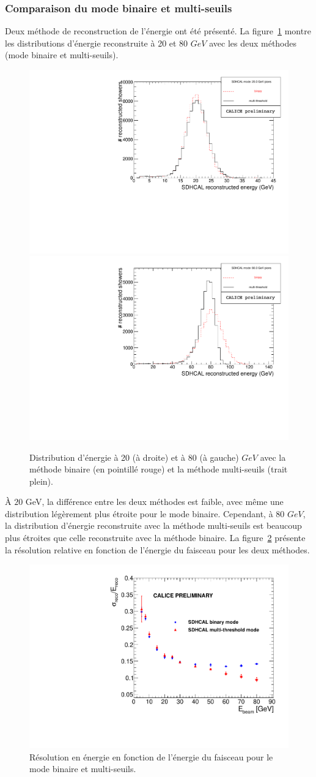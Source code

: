 \subsubsection{Comparaison du mode binaire et multi-seuils}
Deux méthode de reconstruction de l'énergie ont été présenté. La figure~\ref{fig:multi_vs_binary_dist} montre les distributions d'énergie reconstruite à 20 et 80 $GeV$ avec les deux méthodes (mode binaire et multi-seuils).
\begin{figure}[!h]
  \begin{center}
    \includegraphics[width=.45\textwidth]{SDHCAL/figs/Pi20GeV_SDHCAL_2modes_overlay.pdf}
    \includegraphics[width=.45\textwidth]{SDHCAL/figs/Pi80GeV_SDHCAL_2modes_overlay.pdf}
    \caption{Distribution d'énergie à 20 (à droite) et à 80 (à gauche) $GeV$ avec la méthode binaire (en pointillé rouge) et la méthode multi-seuils (trait plein).}
    \label{fig:multi_vs_binary_dist}
  \end{center}
\end{figure}
À $20$ GeV, la différence entre les deux méthodes est faible, avec même une distribution légèrement plus étroite pour le mode binaire. Cependant, à 80 $GeV$, la distribution d'énergie reconstruite avec la méthode multi-seuils est beaucoup plus étroites que celle reconstruite avec la méthode binaire. La figure~\ref{fig:multi_vs_binary_res} présente la résolution relative en fonction de l'énergie du faisceau pour les deux méthodes.
\begin{figure}[!h]
  \begin{center}
    \includegraphics[width=.55\textwidth]{SDHCAL/figs/RESOLUTION.pdf}
    \caption{Résolution en énergie en fonction de l’énergie du faisceau pour le mode binaire et multi-seuils.}
    \label{fig:multi_vs_binary_res}
  \end{center}
\end{figure}
